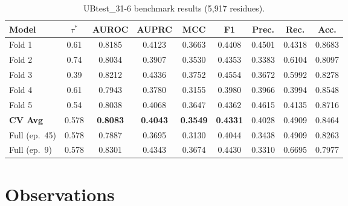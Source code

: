 \documentclass[11pt,a4paper]{article}
\begin{document}
\begin{table}[h]
\centering
\caption{UBtest\_31-6 benchmark results (5{,}917 residues).}
\label{tab:ub}
\setlength{\tabcolsep}{4.5pt}
\begin{tabular}{lcccccccc}
\toprule
\textbf{Model} & $\tau^*$ & \textbf{AUROC} & \textbf{AUPRC} & \textbf{MCC} & \textbf{F1} & \textbf{Prec.} & \textbf{Rec.} & \textbf{Acc.} \\
\midrule
Fold 1 & 0.61 & 0.8185 & 0.4123 & 0.3663 & 0.4408 & 0.4501 & 0.4318 & 0.8683 \\
Fold 2 & 0.74 & 0.8034 & 0.3907 & 0.3530 & 0.4353 & 0.3383 & 0.6104 & 0.8097 \\
Fold 3 & 0.39 & 0.8212 & 0.4336 & 0.3752 & 0.4554 & 0.3672 & 0.5992 & 0.8278 \\
Fold 4 & 0.61 & 0.7943 & 0.3780 & 0.3155 & 0.3980 & 0.3966 & 0.3994 & 0.8548 \\
Fold 5 & 0.54 & 0.8038 & 0.4068 & 0.3647 & 0.4362 & 0.4615 & 0.4135 & 0.8716 \\
\midrule
\textbf{CV Avg} & 0.578 & \textbf{0.8083} & \textbf{0.4043} & \textbf{0.3549} & \textbf{0.4331} & 0.4028 & 0.4909 & 0.8464 \\
\midrule
Full (ep.~45) & 0.578 & 0.7887 & 0.3695 & 0.3130 & 0.4044 & 0.3438 & 0.4909 & 0.8263 \\
Full (ep.~9)  & 0.578 & 0.8301 & 0.4343 & 0.3674 & 0.4430 & 0.3310 & 0.6695 & 0.7977 \\
\bottomrule
\end{tabular}
\end{table}

\section{Observations}
\end{document}
